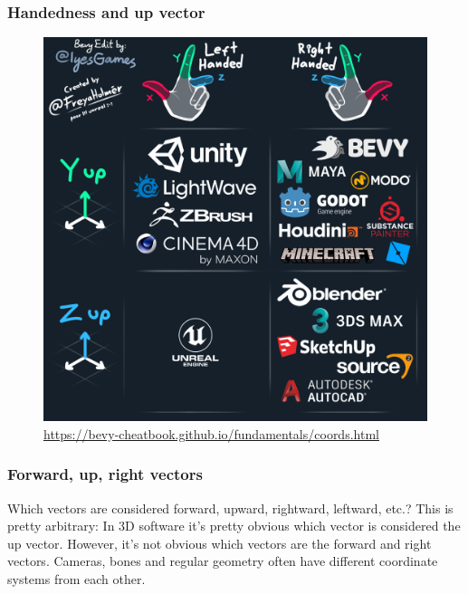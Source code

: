 \documentclass{beamer}
\begin{document}
\begin{frame}
\frametitle{Handedness and up vector}
\begin{figure}
    \centering
    \includegraphics[width=0.8\textheight]{assets/3D_soft_handedness.png}
	\caption*{\url{https://bevy-cheatbook.github.io/fundamentals/coords.html}}
\end{figure}
\end{frame}

\begin{frame}
	\frametitle{Forward, up, right vectors}
	Which vectors are considered forward, upward, rightward, leftward, etc.?
	\vfill
	This is pretty arbitrary: In 3D software it's pretty obvious which vector is considered the up vector. However, it's not obvious which vectors are the forward and right vectors. 
	\vfill
	Cameras, bones and regular geometry often have different coordinate systems from each other. 
\end{frame}
\end{document}

